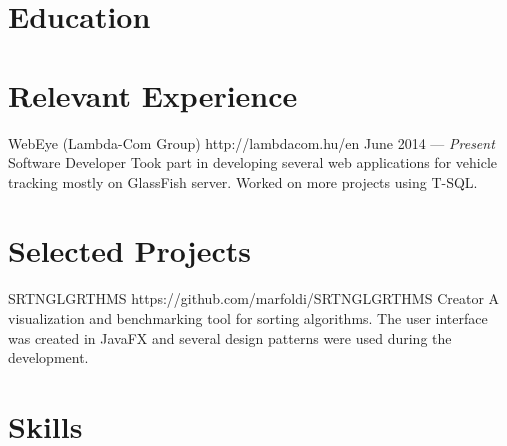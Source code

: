 \documentclass{resume}
\begin{document}

\smallskip

\section{Education}


\section{Relevant Experience}

\employer
	{WebEye (Lambda-Com Group)}
	{http://lambdacom.hu/en}
	{June 2014 --- \emph{Present}}
	{Software Developer}
	{Took part in developing several web applications for vehicle tracking mostly on GlassFish server. Worked on more projects using T-SQL.}
	
\section{Selected Projects}

\project
{SRTNGLGRTHMS}
{https://github.com/marfoldi/SRTNGLGRTHMS}
{Creator}
{A visualization and benchmarking tool for sorting algorithms. The user interface was created in JavaFX and several design patterns were used during the development.}
	
\section{Skills}

\end{document}

